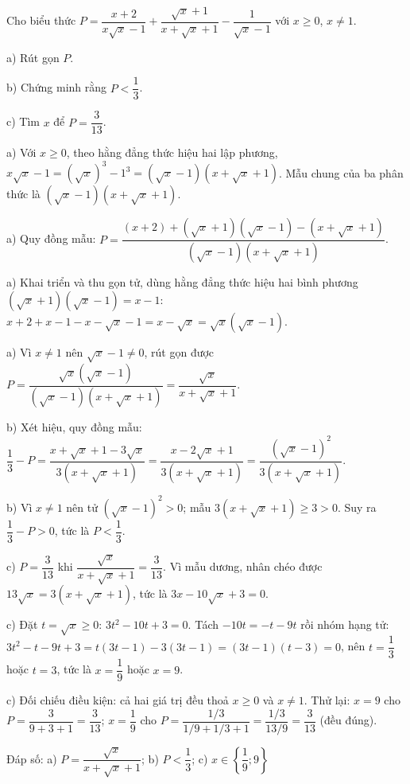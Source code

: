\begin{problem}[9DS-CAN-050]
Cho biểu thức $P = \dfrac{x + 2}{x\sqrt{x} - 1} + \dfrac{\sqrt{x} + 1}{x + \sqrt{x} + 1} - \dfrac{1}{\sqrt{x} - 1}$ với $x \geq 0$, $x \neq 1$.

a) Rút gọn $P$.

b) Chứng minh rằng $P < \dfrac{1}{3}$.

c) Tìm $x$ để $P = \dfrac{3}{13}$.

\begin{solution}
a) Với $x \geq 0$, theo hằng đẳng thức hiệu hai lập phương, $x\sqrt{x} - 1 = (\sqrt{x})^3 - 1^3 = (\sqrt{x} - 1)(x + \sqrt{x} + 1)$. Mẫu chung của ba phân thức là $(\sqrt{x} - 1)(x + \sqrt{x} + 1)$.

a) Quy đồng mẫu: $P = \dfrac{(x + 2) + (\sqrt{x} + 1)(\sqrt{x} - 1) - (x + \sqrt{x} + 1)}{(\sqrt{x} - 1)(x + \sqrt{x} + 1)}$.

a) Khai triển và thu gọn tử, dùng hằng đẳng thức hiệu hai bình phương $(\sqrt{x} + 1)(\sqrt{x} - 1) = x - 1$: $x + 2 + x - 1 - x - \sqrt{x} - 1 = x - \sqrt{x} = \sqrt{x}(\sqrt{x} - 1)$.

a) Vì $x \neq 1$ nên $\sqrt{x} - 1 \neq 0$, rút gọn được $P = \dfrac{\sqrt{x}(\sqrt{x} - 1)}{(\sqrt{x} - 1)(x + \sqrt{x} + 1)} = \dfrac{\sqrt{x}}{x + \sqrt{x} + 1}$.

b) Xét hiệu, quy đồng mẫu: $\dfrac{1}{3} - P = \dfrac{x + \sqrt{x} + 1 - 3\sqrt{x}}{3(x + \sqrt{x} + 1)} = \dfrac{x - 2\sqrt{x} + 1}{3(x + \sqrt{x} + 1)} = \dfrac{(\sqrt{x} - 1)^2}{3(x + \sqrt{x} + 1)}$.

b) Vì $x \neq 1$ nên tử $(\sqrt{x} - 1)^2 > 0$; mẫu $3(x + \sqrt{x} + 1) \geq 3 > 0$. Suy ra $\dfrac{1}{3} - P > 0$, tức là $P < \dfrac{1}{3}$.

c) $P = \dfrac{3}{13}$ khi $\dfrac{\sqrt{x}}{x + \sqrt{x} + 1} = \dfrac{3}{13}$. Vì mẫu dương, nhân chéo được $13\sqrt{x} = 3(x + \sqrt{x} + 1)$, tức là $3x - 10\sqrt{x} + 3 = 0$.

c) Đặt $t = \sqrt{x} \geq 0$: $3t^2 - 10t + 3 = 0$. Tách $-10t = -t - 9t$ rồi nhóm hạng tử: $3t^2 - t - 9t + 3 = t(3t - 1) - 3(3t - 1) = (3t - 1)(t - 3) = 0$, nên $t = \dfrac{1}{3}$ hoặc $t = 3$, tức là $x = \dfrac{1}{9}$ hoặc $x = 9$.

c) Đối chiếu điều kiện: cả hai giá trị đều thoả $x \geq 0$ và $x \neq 1$. Thử lại: $x = 9$ cho $P = \dfrac{3}{9 + 3 + 1} = \dfrac{3}{13}$; $x = \dfrac{1}{9}$ cho $P = \dfrac{1/3}{1/9 + 1/3 + 1} = \dfrac{1/3}{13/9} = \dfrac{3}{13}$ (đều đúng).

Đáp số: a) $\boxed{P = \dfrac{\sqrt{x}}{x + \sqrt{x} + 1}}$; b) $\boxed{P < \dfrac{1}{3}}$; c) $\boxed{x \in \left\{\dfrac{1}{9}; 9\right\}}$
\end{solution}
\end{problem}

